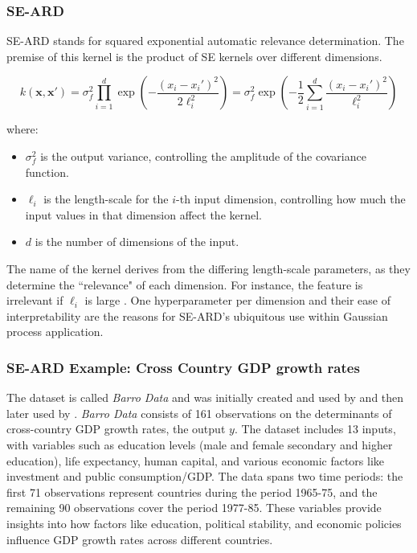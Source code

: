 \documentclass[12pt,a4paper]{article}
\begin{document}
\subsubsection{SE-ARD}
\label{sec:SE-ARD}
SE-ARD stands for squared exponential automatic relevance determination. The premise of this kernel is the product of SE kernels over different dimensions.

\begin{equation}
k(\mathbf{x}, \mathbf{x}') = \sigma_f^2 \prod_{i=1}^{d} \exp\left( -\frac{(x_i - x_i')^2}{2 \ell_i^2} \right) = \sigma_f^2 \exp\left( -\frac{1}{2} \sum_{i=1}^{d} \frac{(x_i - x_i')^2}{\ell_i^2} \right)
\end{equation}

where:
\begin{itemize}
  \item \( \sigma_f^2 \) is the output variance, controlling the amplitude of the covariance function.
  \item \( \ell_i \) is the length-scale for the \(i\)-th input dimension, controlling how much the input values in that dimension affect the kernel.
  \item \( d \) is the number of dimensions of the input.
\end{itemize}

The name of the kernel derives from the differing length-scale parameters, as they determine the ``relevance" of each dimension. For instance, the feature is irrelevant if \(\ell_i\) is large \citep{snelson2006tutorial}. One hyperparameter per dimension and their ease of interpretability are the reasons for SE-ARD's ubiquitous use within Gaussian process application.

\subsubsection{SE-ARD Example: Cross Country GDP growth rates}
\label{sec:SE-ARD Example}

The dataset is called \textit{Barro Data} and was initially created and used by \citet{barro2004economic} and then later used by \citet{koenker1999goodness}. \textit{Barro Data} consists of 161 observations on the determinants of cross-country GDP growth rates, the output \(y\). The dataset includes 13 inputs, with variables such as education levels (male and female secondary and higher education), life expectancy, human capital, and various economic factors like investment and public consumption/GDP. The data spans two time periods: the first 71 observations represent countries during the period 1965-75, and the remaining 90 observations cover the period 1977-85. These variables provide insights into how factors like education, political stability, and economic policies influence GDP growth rates across different countries.
\end{document}
